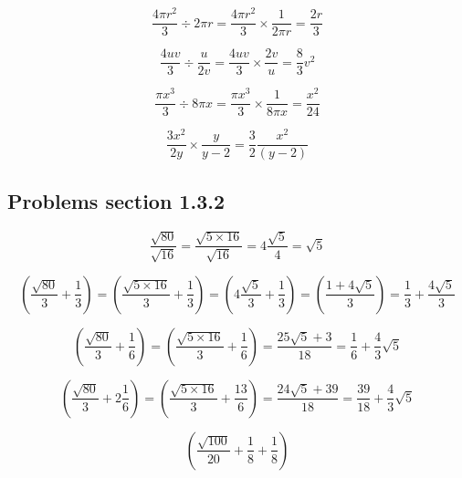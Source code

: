 \begin{equation}
  \frac{4 \pi r^{2}}{3} \div 2 \pi r = \frac{4 \pi r^{2}}{3} \times \frac{1}{2 \pi r} = \frac{2r}{3}
\end{equation}

\begin{equation}
  \frac{4uv}{3} \div \frac{u}{2v} = \frac{4uv}{3} \times \frac{2v}{u} = \frac{8}{3}v^{2}
\end{equation}

\begin{equation}
  \frac{\pi x^{3}}{3} \div 8 \pi x =  \frac{\pi x^{3}}{3} \times \frac{ 1 }{8 \pi x} = \frac{x^{2}}{24}
\end{equation}

\begin{equation}
  \frac{3x^{2}}{2y} \times \frac{y}{y-2} = \frac{3}{2}  \frac{x^{2}}{ ( y-2)} 
\end{equation}

\subsection{Problems section 1.3.2}


\begin{equation}
  \frac{\sqrt{80}}{\sqrt{16}} = \frac{\sqrt{5 \times 16}}{\sqrt{16}} = 4\frac{\sqrt{5}}{4} =\sqrt{5} 
\end{equation}

\begin{equation}
 \left ( \frac{\sqrt{80}}{3} + \frac{1}{3} \right) = \left ( \frac{\sqrt{5 \times 16}}{3} + \frac{1}{3} \right) = \left ( 4\frac{\sqrt{5}}{3} + \frac{1}{3} \right) = \left ( \frac{1 + 4 \sqrt{5}}{3} \right ) = \frac{1}{3} + \frac{4 \sqrt{5}}{3} 
\end{equation}

\begin{equation}
 \left ( \frac{\sqrt{80}}{3} + \frac{1}{6} \right) =  \left ( \frac{\sqrt{5 \times 16}}{3} + \frac{1}{6} \right) = \frac{25 \sqrt{5} + 3}{18} = \frac{1}{6} + \frac{4}{3}\sqrt{5}
\end{equation}

\begin{equation}
 \left (  \frac{\sqrt{80}}{3} + 2\frac{1}{6} \right ) =  \left (  \frac{\sqrt{5 \times 16}}{3} + \frac{13}{6} \right ) = \frac{24 \sqrt{5} + 39}{18} = \frac{39}{18} + \frac{4}{3} \sqrt{5}
\end{equation}

\begin{equation}
 \left (  \frac{\sqrt{100}}{20} + \frac{1}{8} + \frac{1}{8} \right )
\end{equation}

